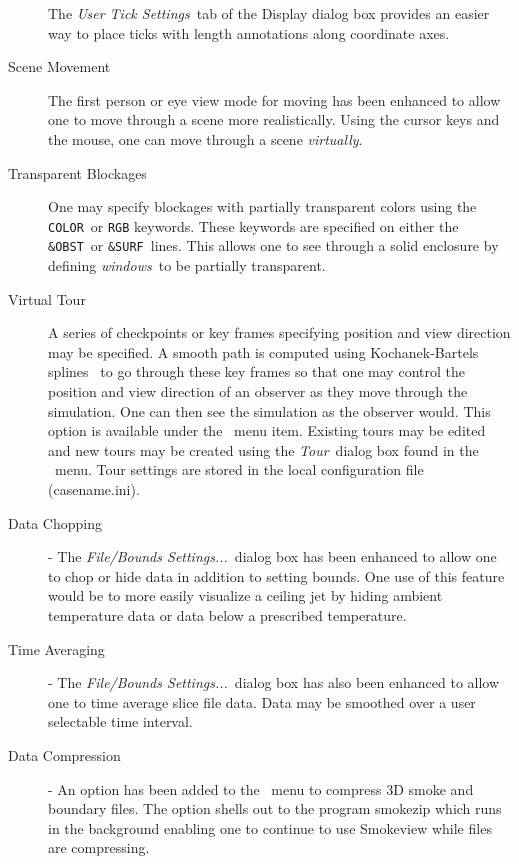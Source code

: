 \documentclass[11pt,twoside]{book}
\newcommand{\tourmenu}{\fbox{\tt Tour} }
\newcommand{\frameit}[1]{\fbox{\tt #1}}
\begin{document}
\begin{description}
The {\em User Tick Settings}\ tab of the Display dialog box
provides an easier way to place ticks with length annotations along coordinate axes.


\item[Scene Movement] The first person or eye view mode for moving
has been enhanced to allow one to move through a scene more
realistically.  Using the cursor keys and the
mouse, one can move through a scene {\em virtually}.

\item[Transparent Blockages] One may specify blockages with partially transparent colors
using the {\tt COLOR}\ or {\tt RGB} keywords.
These keywords are specified on either the {\tt \&OBST}\ or {\tt \&SURF}\ lines.
This allows one to see through a solid enclosure by defining
{\em windows}\ to be partially transparent.

\item[Virtual Tour]   A series of checkpoints or key frames
specifying position and view direction may be specified. A smooth
path is computed using Kochanek-Bartels splines~\cite{Moller:02} to
go through these key frames so that one may control the position
and view direction of an observer as they move through the
simulation. One can then see the simulation as the observer would.
This option is available under the \tourmenu\ menu item. Existing
tours may be edited and new tours may be created using the
{\em Tour}\ dialog box found in the \frameit{Dialogs}\ menu. Tour
settings are stored in the local configuration file
(casename.ini).

\item[Data Chopping] - The {\em File/Bounds Settings...}\
dialog box has been enhanced to allow one to chop or hide data in
addition to setting bounds. One use of this feature would be to
more easily visualize a ceiling jet by hiding ambient temperature
data or data below a prescribed temperature.

\item[Time Averaging] - The {\em File/Bounds Settings...}\
dialog box has also been enhanced to allow one to time average
slice file data.  Data may be smoothed over a user selectable time
interval.

\item[Data Compression] - An option has been added to the
\ menu to compress 3D smoke and boundary
files. The option shells out to the program smokezip which runs in
the background enabling one to continue to use Smokeview while
files are compressing.

\end{description}
\end{document}
